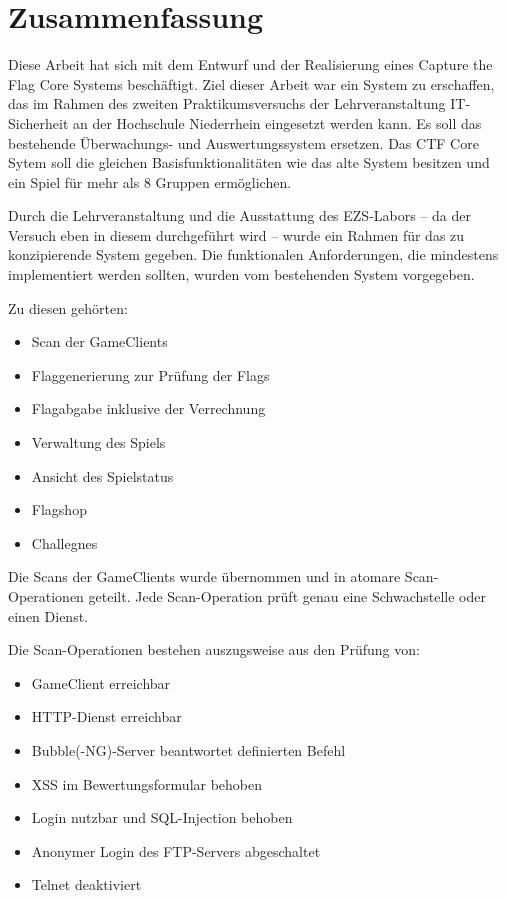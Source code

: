 \section{Zusammenfassung}
Diese Arbeit hat sich mit dem Entwurf und der Realisierung eines Capture the Flag Core Systems beschäftigt. Ziel dieser Arbeit war ein System zu erschaffen, das im Rahmen des zweiten Praktikumsversuchs der Lehrveranstaltung IT-Sicherheit an der Hochschule Niederrhein eingesetzt werden kann. Es soll das bestehende Überwachungs- und Auswertungssystem ersetzen. Das CTF Core Sytem soll die gleichen Basisfunktionalitäten wie das alte System besitzen und ein Spiel für mehr als 8 Gruppen ermöglichen.

Durch die Lehrveranstaltung und die Ausstattung des EZS-Labors -- da der Versuch eben in diesem durchgeführt wird -- wurde ein Rahmen für das zu konzipierende System gegeben.
Die funktionalen Anforderungen, die mindestens implementiert werden sollten, wurden vom bestehenden System vorgegeben.

Zu diesen gehörten:
\begin{itemize}
	\item Scan der GameClients
	\item Flaggenerierung zur Prüfung der Flags
	\item Flagabgabe inklusive der Verrechnung
	\item Verwaltung des Spiels
	\item Ansicht des Spielstatus
	\item Flagshop
	\item Challegnes
\end{itemize}

Die Scans der GameClients wurde übernommen und in atomare Scan-Operationen geteilt. Jede Scan-Operation prüft genau eine Schwachstelle oder einen Dienst.

Die Scan-Operationen bestehen auszugsweise aus den Prüfung von:
\begin{itemize}
	\item GameClient erreichbar
	\item HTTP-Dienst erreichbar
	\item Bubble(-NG)-Server beantwortet definierten Befehl
	\item XSS im Bewertungsformular behoben
	\item Login nutzbar und SQL-Injection behoben
	\item Anonymer Login des FTP-Servers abgeschaltet
	\item Telnet deaktiviert
\end{itemize}

